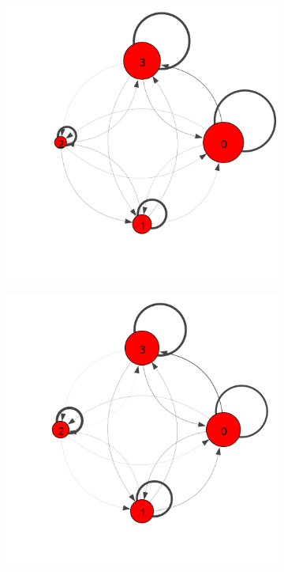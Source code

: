 \begin{figure}
  \centering
  \begin{subfigure}[t]{0.33\textwidth}
    \includegraphics[width=\textwidth,trim={0 3cm 0 2cm}]{figures/trans-comp/trans-avg.png}
    \caption{\label{fig:trans-avg}}
  \end{subfigure}%
  \begin{subfigure}[t]{0.33\textwidth}
    \includegraphics[width=\textwidth,trim={0, 3cm 0 2cm}]{figures/trans-comp/trans-perfect.png}

\end{subfigure}
\end{figure}
